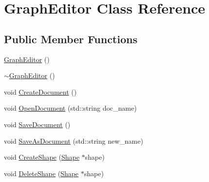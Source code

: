 \hypertarget{class_graph_editor}{\section{Graph\-Editor Class Reference}
\label{class_graph_editor}
}
\subsection*{Public Member Functions}
\begin{DoxyCompactItemize}
\item 
\hyperlink{class_graph_editor_ad98e98f4f39a2c9f50287731cfa3dc9b}{Graph\-Editor} ()
\item 
\hyperlink{class_graph_editor_a063074d0b285eeaa06f8323c763afa7a}{$\sim$\-Graph\-Editor} ()
\item 
void \hyperlink{class_graph_editor_ab9c35db5e96d1fc872666c937175e3e0}{Create\-Document} ()
\item 
void \hyperlink{class_graph_editor_a80ae937e60f65abe455a655dcf676be8}{Open\-Document} (std\-::string doc\-\_\-name)
\item 
void \hyperlink{class_graph_editor_a6fd920b1b44fbf97dfbb5c93bdeb755e}{Save\-Document} ()
\item 
void \hyperlink{class_graph_editor_adf0d28e904bf3f695b56a338920e9fb8}{Save\-As\-Document} (std\-::string new\-\_\-name)
\item 
void \hyperlink{class_graph_editor_aea206c4029c533cc63166887a9f6f716}{Create\-Shape} (\hyperlink{class_shape}{Shape} $\ast$shape)
\item 
void \hyperlink{class_graph_editor_a06311ac02dc5b2443454e6cbf9a9c145}{Delete\-Shape} (\hyperlink{class_shape}{Shape} $\ast$shape)
\end{DoxyCompactItemize}



